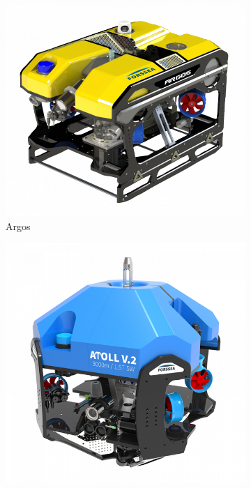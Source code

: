     \begin{figure}[!htb]
        \centering
        \begin{subfigure}[b]{0.3\textwidth}
            \centering
            \includegraphics[width=\textwidth]{imgs/Argos.png}
            \caption{\gls{Argos}}
        \end{subfigure}
        \hfill
        \begin{subfigure}[b]{0.3\textwidth}
            \centering
            \includegraphics[width=\textwidth]{imgs/Atoll.png}

\end{subfigure}
\end{figure}
